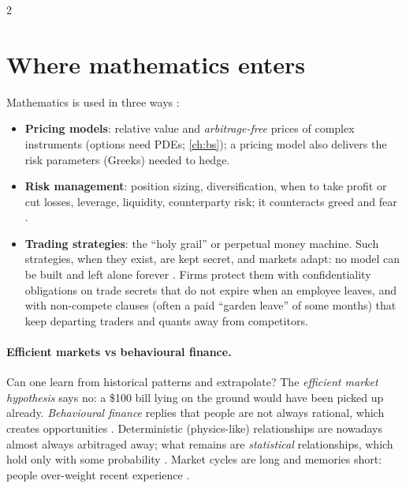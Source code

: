 \begin{paracol}{2}
\section{Where mathematics enters}\label{sec:mathuse}
Mathematics is used in three ways :
\begin{itemize}
  \item \textbf{Pricing models}: relative value and \emph{arbitrage-free} prices of complex
        instruments (options need PDEs; \cref{ch:bs}); a pricing model also delivers the risk
        parameters (Greeks) needed to hedge.
  \item \textbf{Risk management}: position sizing, diversification, when to take profit or cut
        losses, leverage, liquidity, counterparty risk; it counteracts greed and fear
        .
  \item \textbf{Trading strategies}: the ``holy grail'' or perpetual money machine. Such
        strategies, when they exist, are kept secret, and markets adapt: no model can be built
        and left alone forever . Firms protect them with confidentiality
        obligations on trade secrets that do not expire when an employee leaves, and with
        non-compete clauses (often a paid ``garden leave'' of some months) that keep departing
        traders and quants away from competitors.
\end{itemize}

\paragraph{Efficient markets vs behavioural finance.} Can one learn from historical patterns and
extrapolate? The \emph{efficient market hypothesis} says no: a \$100 bill lying on the ground would
have been picked up already. \emph{Behavioural finance} replies that people are not always
rational, which creates opportunities . Deterministic (physics-like)
relationships are nowadays almost always arbitraged away; what remains are \emph{statistical}
relationships, which hold only with some probability . Market cycles are long
and memories short: people over-weight recent experience .


\end{paracol}

